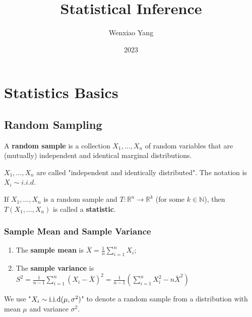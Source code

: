 \documentclass[11pt]{elegantbook}
\title{Statistical Inference}
\author{Wenxiao Yang}
\institute{Haas School of Business, University of California Berkeley}
\date{2023}
\begin{document}
\maketitle

\frontmatter
\tableofcontents

\mainmatter

\chapter{Statistics Basics}
\section{Random Sampling}
\begin{definition}
    \normalfont
    A \textbf{random sample} is a collection $X_1,...,X_n$ of random variables that are (mutually) independent and identical marginal distributions.

    $X_1,...,X_n$ are called "independent and identically distributed". The notation is $X_i\sim i.i.d. $
\end{definition}

\begin{definition}[Statistic]
    \normalfont
    If $X_1,...,X_n$ is a random sample and $T: \mathbb{R}^n \rightarrow \mathbb{R}^k$ (for some $k\in \mathbb{N}$), then $T(X_1,...,X_n)$ is called a \textbf{statistic}.
\end{definition}

\subsection{Sample Mean and Sample Variance}
\begin{definition}
    \normalfont
    \begin{enumerate}
        \item The \textbf{sample mean} is $\bar{X}=\frac{1}{n}\sum_{i=1}^n X_i$;
        \item The \textbf{sample variance} is $S^2=\frac{1}{n-1}\sum_{i=1}^n (X_i-\bar{X})^2=\frac{1}{n-1}(\sum_{i=1}^n X_i^2 - n\bar{X}^2)$
    \end{enumerate}
\end{definition}

\begin{note}
    We use "$X_i\sim \textnormal{i.i.d}(\mu,\sigma^2)$" to denote a random sample from a distribution with mean $\mu$ and variance $\sigma^2$.
\end{note}
\end{document}
